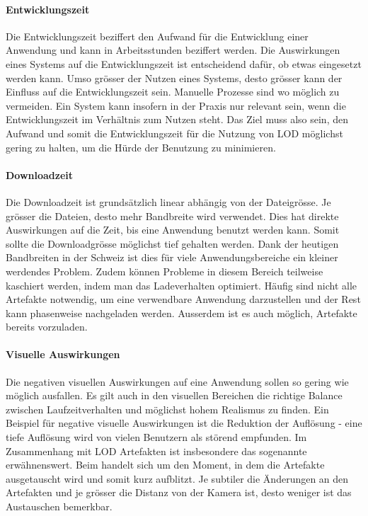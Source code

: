 \paragraph{Entwicklungszeit}

Die Entwicklungszeit beziffert den Aufwand für die Entwicklung einer Anwendung und kann in Arbeitsstunden beziffert werden.
Die Auswirkungen eines Systems auf die Entwicklungszeit ist entscheidend dafür, ob etwas eingesetzt werden kann. Umso grösser der Nutzen eines Systems, desto grösser kann der Einfluss auf die Entwicklungszeit sein. Manuelle Prozesse sind wo möglich zu vermeiden. Ein System kann insofern in der Praxis nur relevant sein, wenn die Entwicklungszeit im Verhältnis zum Nutzen steht. Das Ziel muss also sein, den Aufwand und somit die Entwicklungszeit für die Nutzung von LOD möglichst gering zu halten, um die Hürde der Benutzung zu minimieren.

\paragraph{Downloadzeit}

Die Downloadzeit ist grundsätzlich linear abhängig von der Dateigrösse.
Je grösser die Dateien, desto mehr Bandbreite wird verwendet. Dies hat direkte Auswirkungen auf die Zeit, bis eine Anwendung benutzt werden kann. Somit sollte die Downloadgrösse möglichst tief gehalten werden.
Dank der heutigen Bandbreiten in der Schweiz ist dies für viele Anwendungsbereiche ein kleiner werdendes Problem. 
Zudem können Probleme in diesem Bereich teilweise kaschiert werden, indem man das Ladeverhalten optimiert. Häufig sind nicht alle Artefakte notwendig, um eine verwendbare Anwendung darzustellen und der Rest kann phasenweise nachgeladen werden.
Ausserdem ist es auch möglich, Artefakte bereits vorzuladen.

\paragraph{Visuelle Auswirkungen}

Die negativen visuellen Auswirkungen auf eine Anwendung sollen so gering wie möglich ausfallen. Es gilt auch in den visuellen Bereichen die richtige Balance zwischen Laufzeitverhalten und möglichst hohem Realismus zu finden. Ein Beispiel für negative visuelle Auswirkungen ist die Reduktion der Auflösung - eine tiefe Auflösung wird von vielen Benutzern als störend empfunden. Im Zusammenhang mit LOD Artefakten ist insbesondere das sogenannte  erwähnenswert.
Beim  handelt sich um den Moment, in dem die Artefakte ausgetauscht wird und somit kurz aufblitzt. Je subtiler die Änderungen an den Artefakten und je grösser die Distanz von der Kamera ist, desto weniger ist das Austauschen bemerkbar.

